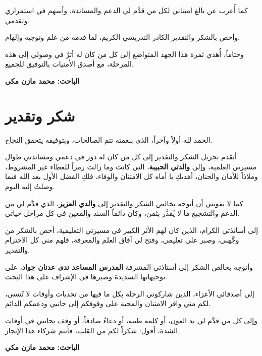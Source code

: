 \documentclass[12pt, a4paper]{report}
\begin{document}
كما أُعرب عن بالغ امتناني لكل من قدَّم لي الدعم والمساندة، وأسهم في استمراري وتقدمي.

وأخص بالشكر والتقدير الكادر التدريسي الكريم، لما قدمه من علم وتوجيه وإلهام.

وختاماً، أُهدي ثمرة هذا الجهد المتواضع إلى كل من كان له أثرٌ في وصولي إلى هذه المرحلة، مع أصدق الأمنيات بالتوفيق للجميع.

\vspace{1cm}
\begin{flushright}
\textbf{الباحث: محمد مازن مكي}
\end{flushright}

\newpage\thispagestyle{empty}
\chapter*{شكر وتقدير}

الحمد لله أولاً وآخراً، الذي بنعمته تتم الصالحات، وبتوفيقه يتحقق النجاح.

أتقدم بجزيل الشكر والتقدير إلى كل من كان له دور في دعمي ومساندتي طوال مسيرتي العلمية، وإلى \textbf{والدتي الحبيبة}، التي كانت وما زالت رمزاً للعطاء غير المشروط، وملاذاً للأمان والحنان، أهديكِ يا أماه كل الامتنان والوفاء، فلكِ الفضل الأول بعد الله فيما وصلتُ إليه اليوم.

كما لا يفوتني أن أتوجه بخالص الشكر والتقدير إلى \textbf{والدي العزيز}، الذي قدَّم لي من الدعم والتشجيع ما لا يُقدَّر بثمن، وكان دائماً السند والمعين في كل مراحل حياتي.

إلى أساتذتي الكرام، الذين كان لهم الأثر الكبير في مسيرتي التعليمية، أخص بالشكر من وجَّهني، وصبر على تعليمي، وفتح لي آفاق العلم والمعرفة، فلهم مني كل الاحترام والتقدير.

وأتوجه بخالص الشكر إلى أستاذتي المشرفة \textbf{المدرس المساعد ندى عدنان جواد}، على توجيهاتها السديدة وصبرها في الإشراف على هذا البحث.

إلى أصدقائي الأعزاء، الذين شاركوني الرحلة بكل ما فيها من تحديات وأوقات لا تُنسى، لكم مني وافر الامتنان والمحبة على وقوفكم إلى جانبي ودعمكم الدائم.

وإلى كل من قدَّم لي يد العون، أو كلمة طيبة، أو دعاءً صادقاً، أو وقف بجانبي في أوقات الشدة، أقول: شكراً لكم من القلب، فأنتم شركاء هذا الإنجاز.

\vspace{1cm}
\begin{flushright}
\textbf{الباحث: محمد مازن مكي}
\end{flushright}
\end{document}
